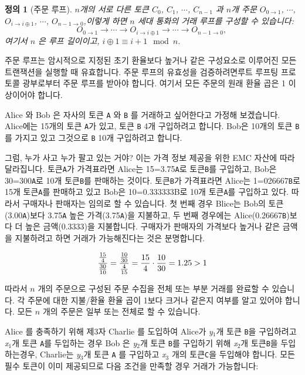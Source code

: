 \documentclass{article}
\newtheorem{definition}{정의}[section]
\begin{document}
\begin{multicols}{2}
\begin{definition}[주문 루프] $n$개의 서로 다른 토큰 $C_{0}$, $C_{1}$, $\cdots$, $C_{n-1}$ 과 $n$개 주문 $O_{0\rightarrow 1}$, $\cdots$, $O_{i\rightarrow i\oplus 1}$, $\cdots$, $O_{n-1 \rightarrow 0}$,이렇게 하면 $n$ 세대 통화의 거래 루프를 구성할 수 있습니다:$$O_{0\rightarrow 1} \rightarrow \cdots \rightarrow O_{i\rightarrow i\oplus 1} \rightarrow \cdots \rightarrow O_{n-1\rightarrow 0}\text{, }$$
	여기서 $n$ 은 루프 길이이고, $i\oplus 1 \equiv i+1 \mod n$.
\end{definition}

\indent 주문 루프는 암시적으로 지정된 초기 환율보다 높거나 같은 구성요소로 이루어진 모든 트랜잭션을 실행할 때 유효합니다. 주문 루프의 유효성을 검증하려면루트 루프팅 프로토콜 광부로부터 주문 루프를 받아야 합니다. 여기서 모든 주문의 원래 환율 곱은 1 이상이어야 합니다.

\indent Alice 와 Bob 은 자사의 토큰  \verb|A| 와 \verb|B| 를 거래하고 싶어한다고 가정해 보겠습니다. Alice에는 15개의 토큰  \verb|A|가 있고, 토큰 \verb|B| 4개 구입하려고 합니다. Bob은 10개의 토큰  \verb|B|를 가지고 있고 그것으로 \verb|B| 10개 구입하려고 합니다.

\indent 그럼, 누가 사고 누가 팔고 있는 거야? 이는 가격 정보 제공을 위한 EMC 자산에 따라 달라집니다. 토큰\verb|A|가 가격표라면 Alice는 15=3.75\verb|A|로 토큰\verb|B|를 구입하고, Bob은 30=300\verb|A|로 10개 토큰\verb|B|를 판매하는 것이다. 토큰\verb|B|가 가격표라면 Alice는 1=026667\verb|B|로 15개 토큰\verb|A|를 판매하고 있고 Bob은 10=0.333333B로 10개 토큰\verb|A|를 구입하고 있다. 따라서 구매자나 판매자는 임의로 할 수 있습니다. 첫 번째 경우 Blice는 Bob의 토큰(3.00\verb|A|)보다 3.75\verb|A| 높은 가격(3.75\verb|A|)을 지불하고, 두 번째 경우에는 Alice(0.26667\verb|B|)보다 더 높은 금액(0.3333)을 지불합니다. 구매자가 판매자의 가격보다 높거나 같은 금액을 지불하려고 하면 거래가 가능해진다는 것은 분명합니다.

\begin{equation}
{{15\over 4} \over {30\over 10}} = {{10\over 30} \over {4\over 15}}={15 \over 4} \cdot {10 \over 30} = 1.25 > 1
\end{equation}

\indent 따라서 $n$ 개의 주문으로 구성된 주문 수집을 전체 또는 부분 거래를 완료할 수 있습니다. 각 주문에 대한 지불/환율 환율 곱이 1보다 크거나 같은지 여부를 알고 있어야 합니다. 모든 $n$ 개의 주문은 일부 또는 전체로 \cite{supersymmetry} 할 수 있습니다.

\indent Alice 를 충족하기 위해 제3자 Charlie 를 도입하여 Alice가 \textit{y}$_1$개 토큰 \verb|B|을 구입하려고 \textit{x}$_1$개 토큰 \verb|A|를 두입하는 경우 Bob 은 \textit{y}$_2$개 토큰 \verb|B|를 구입하기 위해 \textit{x}$_2$개 토큰\verb|B|을 두입하는경우, Charlie는 \textit{y}$_3$개 토큰 \verb|A| 를 구입하고 \textit{x}$_3$ 개의 토큰\verb|C|을 두입해야 합니다. 모든 필수 토큰이 이미 제공되므로 다음 조건을 만족할 경우 거래가 가능합니다:


\end{multicols}
\end{document}
